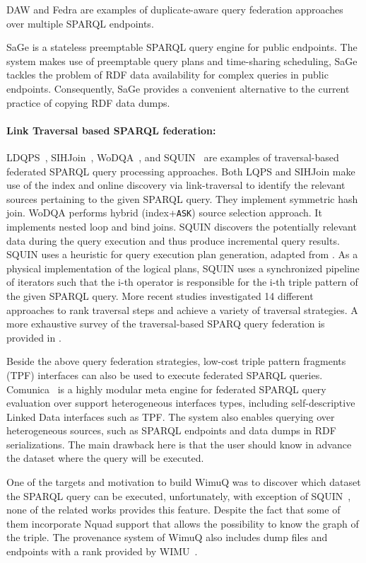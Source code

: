 DAW \cite{daw2013} 
and Fedra \cite{fedra2015} are examples of duplicate-aware query federation approaches over multiple SPARQL endpoints. 

SaGe\cite{DBLP:journals/corr/abs-1806-00227} is a stateless preemptable SPARQL query engine for public endpoints. The system makes use of preemptable query plans and time-sharing scheduling, SaGe tackles the problem of RDF data availability for complex queries in public endpoints. Consequently, SaGe provides a convenient alternative to the current practice of copying RDF data dumps.

\paragraph*{\textbf{Link Traversal based SPARQL federation:}} LDQPS~\cite{ldqp2010}, SIHJoin~\cite{sihjoin2011}, WoDQA~\cite{wodqa2012}, and SQUIN~\cite{hartig2013squin} are examples of traversal-based federated SPARQL query processing approaches.  
Both LQPS and SIHJoin make use of the index and  online discovery via link-traversal to identify the relevant sources pertaining to the given SPARQL query. They implement symmetric hash join. WoDQA performs hybrid (index+\texttt{ASK}) source selection approach. It implements nested loop and bind joins. SQUIN discovers the potentially relevant data during the query execution and thus produce incremental query results. SQUIN uses a heuristic for query execution plan generation, adapted from \cite{zk2011}. As a physical implementation of the logical plans, SQUIN uses a synchronized pipeline of iterators such that the i-th operator is responsible for the i-th triple pattern of the given SPARQL query. More recent studies \cite{hartig2016walking} investigated 14 different approaches to rank traversal steps and achieve a variety of traversal strategies. 
A more exhaustive survey of the traversal-based SPARQ query federation is provided in \cite{hartig2009executing}. 

Beside the above query federation strategies, low-cost triple pattern fragments (TPF) interfaces \cite{verborgh2016triple} can also be used to execute federated SPARQL queries. Comunica~\cite{taelman2018comunica} is a highly modular meta engine for federated SPARQL query evaluation over support heterogeneous interfaces types, including self-descriptive Linked Data interfaces such as TPF. The system also enables querying over heterogeneous sources, such as SPARQL endpoints and data dumps in RDF serializations. The main drawback here is that the user should know in advance the dataset where the query will be executed.

One of the targets and motivation to build WimuQ was to discover which dataset the SPARQL query can be executed, unfortunately, with exception of SQUIN~\cite{hartig2013squin}, none of the related works provides this feature. Despite the fact that some of them incorporate Nquad support that allows the possibility to know the graph of the triple. The provenance system of WimuQ also includes dump files and endpoints with a rank provided by WIMU~\cite{valdestilhas2018my}.